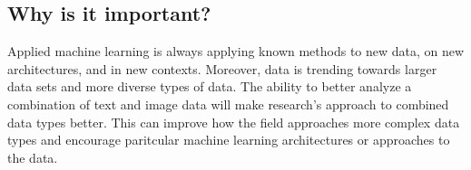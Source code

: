 \subsection{Why is it important?}

Applied machine learning is always applying known methods to new data, on new architectures, and in new contexts.  Moreover, data is trending towards larger data sets and more diverse types of data.  The ability to better analyze a combination of text and image data will make research's approach to combined data types better.  This can improve how the field approaches more complex data types and encourage paritcular machine learning architectures or approaches to the data.



